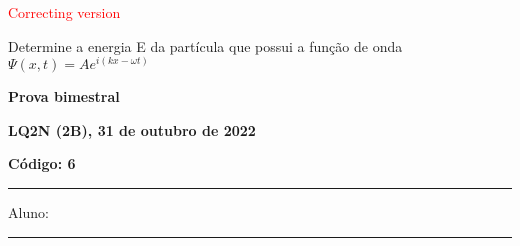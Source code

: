 \documentclass[12pt, addpoints]{exam}
\begin{document}
        \begin{center}
\textcolor{red}{\emph\Large Correcting version}\end{center}
\begin{questions}
\begin{multicols*}{2}
\question[20] Determine a energia E da partícula que possui a função de onda $\Psi(x,t)=Ae^{i(kx-\omega t)}$

\begin{oneparchoices}
\end{oneparchoices}
\end{multicols*}
\end{questions}
\newpage
        \begin{minipage}[b]{0.75\linewidth}
            \begin{flushleft}
                {\bf \large Prova bimestral}
            \end{flushleft}
            \begin{flushleft}
                {\bf \large LQ2N (2B), 31 de outubro de 2022}
            \end{flushleft}
        \end{minipage}
        \begin{minipage}[b]{0.20\linewidth}
            \begin{flushright}
                {\bf \large Código: 6}
            \end{flushright}
        \end{minipage}
        \vspace{0.5cm} \hrule \vspace{0.5cm}
        \begin{minipage}{0.75\linewidth}
            Aluno:
        \end{minipage}
        \vspace{0.5cm} \hrule \vspace{0.5cm}
\end{document}
